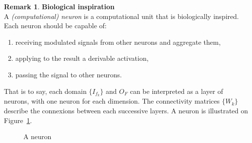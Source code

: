 \documentclass{article}
\theoremstyle{definition}
\newtheorem{definition}{Definition}[section]
\newtheorem{remark}{Remark}
\newcommand{\ovec}{}
\begin{document}

\begin{remark}\textbf{Biological inspiration}\\
A \emph{(computational) neuron} is a computational unit that is biologically inspired. Each neuron should be capable of:
\begin{enumerate}
\item receiving modulated signals from other neurons and aggregate them,
\item applying to the result a derivable activation,
\item passing the signal to other neurons.
\end{enumerate}
That is to say, each domain $\{I_{f_k}\}$ and $O_F$ can be interpreted as a layer of neurons, with one neuron for each dimension. The connectivity matrices $\{W_k\}$ describe the connexions between each successive layers.
A neuron is illustrated on Figure~\ref{fig:neuron}.
\end{remark}

\begin{figure}[h]
\centering
{}
\caption{A neuron}
\label{fig:neuron}
\end{figure}
\end{document}
